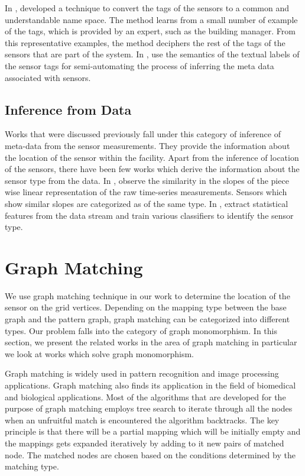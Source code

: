 In \cite{bhattacharya2014enabling}, \citeauthor{bhattacharya2014enabling} developed a technique to convert the tags of the sensors to a common and understandable name space. The method learns from a small number of example of the tags, which is provided by an expert, such as the building manager. From this representative examples, the method deciphers the rest of the tags of the sensors that are part of the system.
In \cite{Schumann:2014:TAD:2674061.2674081}, \citeauthor{Schumann:2014:TAD:2674061.2674081} use the semantics of the textual labels of the sensor tags for semi-automating the process of inferring the meta data associated with sensors.
\subsection{Inference from Data}
Works \cite{Hong:2013:TAS:2528282.2528302,doi:10.1061/9780784413616.226,Koc:2014:CLC:2674061.2674075,Lu:2014:SBS:2648771.2629441,ellis2012creating,muller2014automated,marinakis2005learning} that were discussed previously fall under this category of inference of meta-data from the sensor measurements. They provide the information about the location of the sensor within the facility. 
Apart from the inference of location of the sensors, there have been few works which derive the information about the sensor type from the data. In \cite{calbimonte2012deriving}, \citeauthor{calbimonte2012deriving} observe the similarity in the slopes of the piece wise linear representation of the raw time-series measurements. Sensors which show similar slopes are categorized as of the same type. In \cite{gao2015data}, \citeauthor{gao2015data} extract statistical features from the data stream and train various classifiers to identify the sensor type.
\section{Graph Matching}
\label{sec:graphLitReview}
We use graph matching technique in our work to determine the location of the sensor on the grid vertices. Depending on the mapping type between the base graph and the pattern graph, graph matching can be categorized into different types. Our problem falls into the category of graph monomorphism. In this section, we present the related works in the area of graph matching in particular we look at works which solve graph monomorphism.

Graph matching is widely used in pattern recognition and image processing applications. Graph matching also finds its application in the field of biomedical and biological applications. 
Most of the algorithms that are developed for the purpose of graph matching employs tree search to iterate through all the nodes when an unfruitful match is encountered the algorithm backtracks.
The key principle is that there will be a partial mapping which will be initially empty and the mappings gets expanded iteratively by adding to it new pairs of matched node. The matched nodes are chosen based on the conditions determined by the matching type.

